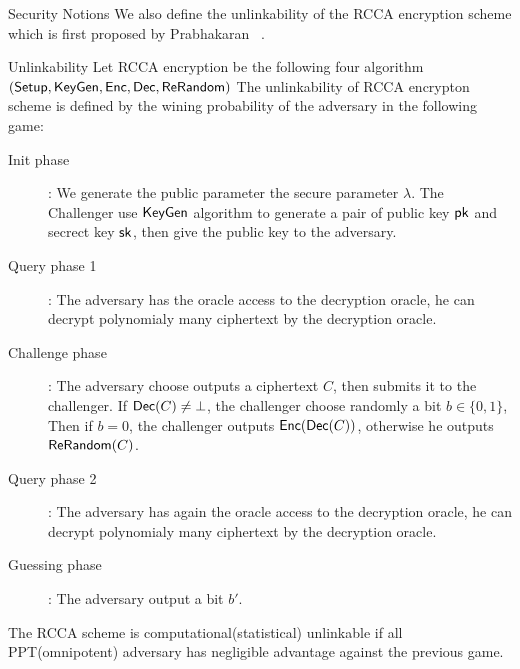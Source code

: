 \begin{subsection}{Security Notions}
  We also define the unlinkability of the RCCA encryption scheme which is first proposed by Prabhakaran \etal~\cite{DBLP:conf/crypto/PrabhakaranR07}.
  \begin{myDef}{Unlinkability}
    Let RCCA encryption be the following four algorithm $({\mathsf{Setup}}, {\mathsf{KeyGen}}, {\mathsf{Enc}}, {\mathsf{Dec}}, {\mathsf{ReRandom}})$
    The unlinkability of RCCA encrypton scheme is defined by the wining probability of the adversary in the following game:
    \begin{description}
    \item[Init phase]:
      We generate the public parameter \wrt the secure parameter $\lambda$. The Challenger use ${\mathsf{KeyGen}}$ algorithm to generate a pair of public key $\mathsf{pk}$ and secrect key $\mathsf{sk}$, then give the public key to the adversary.
    \item[Query phase 1]: The adversary has the oracle access to the decryption oracle, he can decrypt polynomialy many ciphertext by the decryption oracle.
    \item[Challenge phase]: The adversary choose outputs a ciphertext $C$, then submits it to the challenger. If ${\mathsf{Dec}}(C)\neq \bot$, the challenger choose randomly a bit $b \in \{0,1\}$, Then if $b = 0$, the challenger outputs ${\mathsf{Enc}}({\mathsf{Dec}}(C))$, otherwise he outputs ${\mathsf{ReRandom}}(C)$.
    \item[Query phase 2]: The adversary has again the oracle access to the decryption oracle, he can decrypt polynomialy many ciphertext by the decryption oracle.
    \item[Guessing phase]: The adversary output a bit $b'$.
    \end{description}

    The RCCA scheme is computational(\resp statistical) unlinkable if all PPT(\resp omnipotent) adversary has negligible advantage against the previous game. 
  \end{myDef}
  

\end{subsection}
